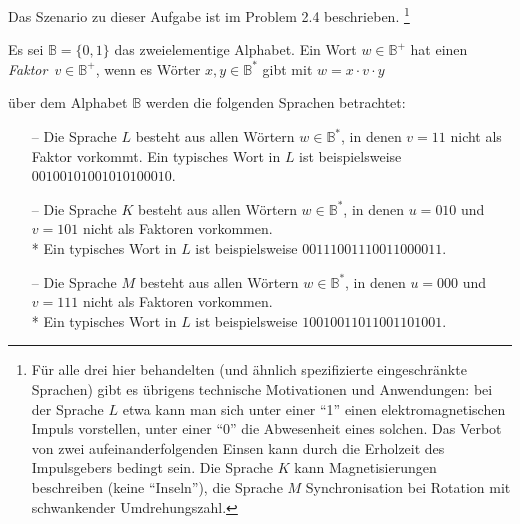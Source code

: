 Das Szenario zu dieser Aufgabe ist im Problem 2.4 beschrieben.
\footnote{
Für alle drei hier behandelten (und ähnlich spezifizierte eingeschränkte
Sprachen) gibt es übrigens technische Motivationen und Anwendungen: bei der
Sprache $L$ etwa kann man sich unter einer ``1'' einen elektromagnetischen
Impuls vorstellen, unter einer ``0'' die Abwesenheit eines solchen. Das Verbot
von zwei aufeinanderfolgenden Einsen kann durch die Erholzeit des Impulsgebers
bedingt sein. Die Sprache $K$ kann Magnetisierungen beschreiben (keine
``Inseln''), die Sprache $M$ Synchronisation bei Rotation mit schwankender
Umdrehungszahl.
}

Es sei $\mathbb{B} = \{0,1\}$ das zweielementige Alphabet. Ein Wort $w \in
\mathbb{B}^+$ hat einen \emph{Faktor}~$v \in \mathbb{B}^+$, wenn es Wörter
$x,y \in \mathbb{B}^*$ gibt mit $w=x \cdot v \cdot y$

über dem Alphabet $\mathbb{B}$ werden die folgenden Sprachen betrachtet:
\begin{itemize}
\item[--] Die Sprache $L$ besteht aus allen Wörtern $w \in \mathbb{B}^*$, in
	denen $v=11$ nicht als Faktor vorkommt. Ein typisches Wort in $L$ ist
	beispielsweise $00100101001010100010$.

\item[--] Die Sprache $K$ besteht aus allen Wörtern $w \in \mathbb{B}^*$, in
	denen $u=010$ und $v=101$ nicht als Faktoren vorkommen.\\* Ein
	typisches Wort in $L$ ist beispielsweise $00111001110011000011$.

\item[--] Die Sprache $M$ besteht aus allen Wörtern $w \in \mathbb{B}^*$, in
	denen $u=000$ und $v=111$ nicht als Faktoren vorkommen.\\* Ein
	typisches Wort in $L$ ist beispielsweise $10010011011001101001$.
\end{itemize}


